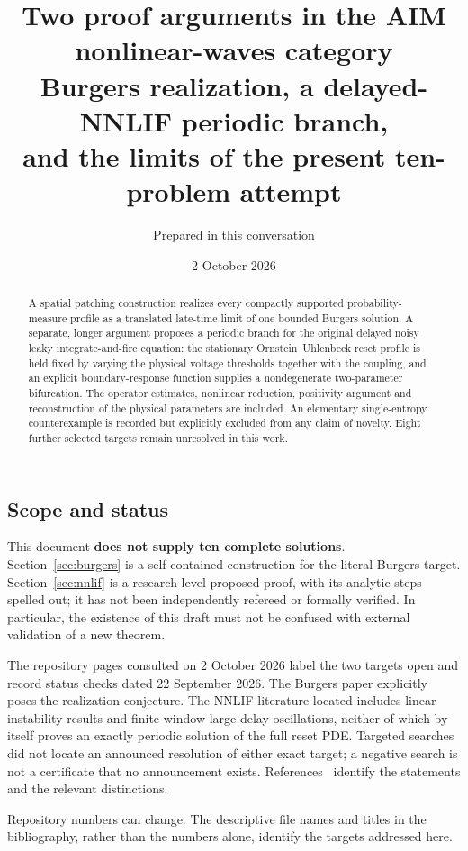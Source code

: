 \documentclass[11pt,a4paper]{article}
\title{\textbf{Two proof arguments in the AIM nonlinear-waves category}\\[5pt]
\large Burgers realization, a delayed-NNLIF periodic branch,\\and the limits of the present ten-problem attempt}
\author{Prepared in this conversation}
\date{2 October 2026}
\numberwithin{equation}{section}
\theoremstyle{remark}\newtheorem{remark}[theorem]{Remark}
\begin{document}
\maketitle
\begin{abstract}
A spatial patching construction realizes every compactly supported probability-measure profile as a translated late-time limit of one bounded Burgers solution. A separate, longer argument proposes a periodic branch for the original delayed noisy leaky integrate-and-fire equation: the stationary Ornstein--Uhlenbeck reset profile is held fixed by varying the physical voltage thresholds together with the coupling, and an explicit boundary-response function supplies a nondegenerate two-parameter bifurcation. The operator estimates, nonlinear reduction, positivity argument and reconstruction of the physical parameters are included. An elementary single-entropy counterexample is recorded but explicitly excluded from any claim of novelty. Eight further selected targets remain unresolved in this work.
\end{abstract}

\subsection*{Scope and status}
This document \textbf{does not supply ten complete solutions}. Section~\ref{sec:burgers} is a self-contained construction for the literal Burgers target. Section~\ref{sec:nnlif} is a research-level proposed proof, with its analytic steps spelled out; it has not been independently refereed or formally verified. In particular, the existence of this draft must not be confused with external validation of a new theorem.

The repository pages consulted on 2 October 2026 label the two targets open and record status checks dated 22 September 2026. The Burgers paper explicitly poses the realization conjecture. The NNLIF literature located includes linear instability results and finite-window large-delay oscillations, neither of which by itself proves an exactly periodic solution of the full reset PDE. Targeted searches did not locate an announced resolution of either exact target; a negative search is not a certificate that no announcement exists. References~\cite{burgersentry,nnlifentry,gs,ccr,rs} identify the statements and the relevant distinctions.

Repository numbers can change. The descriptive file names and titles in the bibliography, rather than the numbers alone, identify the targets addressed here.
\end{document}
